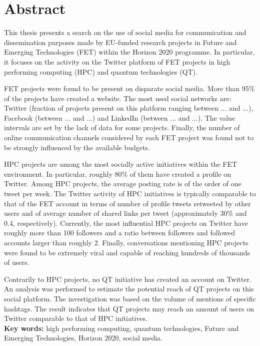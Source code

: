 \chapter*{Abstract}
This thesis presents a search on the use of social media for communication and dissemination purposes made by EU-funded research projects in Future and Emerging Technologies (FET) within the Horizon 2020 programme. In particular, it focuses on the activity on the Twitter platform of FET projects in high performing computing (HPC) and quantum technologies (QT).

FET projects were found to be present on disparate social media. More than 95\% of the projects have created a website. The most used social networks are: Twitter (fraction of projects present on this platform ranging between ... and ...), Facebook (between ... and ...) and LinkedIn (between ... and ...). The value intervals are set by the lack of data for some projects. Finally, the number of online communication channels considered by each FET project was found not to be strongly influenced by the available budgets.

HPC projects are among the most socially active initiatives within the FET environment. In particular, roughly 80\% of them have created a profile on Twitter. Among HPC projects, the average posting rate is of the order of one tweet per week. The Twitter activity of HPC initiatives is typically comparable to that of the FET account in terms of number of profile tweets retweeted by other users and of average number of shared links per tweet (approximately 30\% and 0.4, respectively). Currently, the most influential HPC projects on Twitter have roughly more than 100 followers and a ratio between followers and followed accounts larger than roughly 2. Finally, conversations mentioning HPC projects were found to be extremely viral and capable of reaching hundreds of thousands of users.

Contrarily to HPC projects, no QT initiative has created an account on Twitter. An analysis was performed to estimate the potential reach of QT projects on this social platform. The investigation was based on the volume of mentions of specific hashtags. The result indicates that QT projects may reach an amount of users on Twitter comparable to that of HPC initiatives. \\

\noindent
\textbf{Key words:} high performing computing, quantum technologies, Future and Emerging Technologies, Horizon 2020, social media.